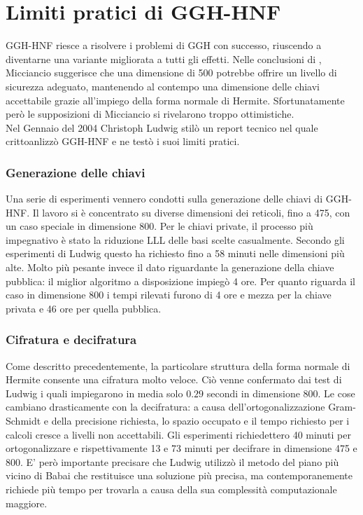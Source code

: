\section{Limiti pratici di GGH-HNF}
GGH-HNF riesce a risolvere i problemi di GGH con successo, riuscendo a diventarne una variante migliorata
a tutti gli effetti. Nelle conclusioni di \cite{HNF01}, Micciancio suggerisce che una dimensione di 
500 potrebbe offrire un livello di sicurezza adeguato, mantenendo al contempo una dimensione delle 
chiavi accettabile grazie all'impiego della forma normale di Hermite. Sfortunatamente però le 
supposizioni di Micciancio si rivelarono troppo ottimistiche. \\
Nel Gennaio del 2004 Christoph Ludwig stilò un report tecnico \cite{HNF04} nel quale crittoanlizzò
GGH-HNF e ne testò i suoi limiti pratici. 

\subsubsection{Generazione delle chiavi}
Una serie di esperimenti vennero condotti sulla generazione delle chiavi di GGH-HNF.
Il lavoro si è concentrato su diverse dimensioni dei reticoli, fino a 475, 
con un caso speciale in dimensione 800.
Per le chiavi private, il processo più impegnativo è stato la riduzione LLL delle basi scelte 
casualmente. Secondo gli esperimenti di Ludwig questo ha richiesto fino a 58 minuti nelle dimensioni più alte.
Molto più pesante invece il dato riguardante la generazione della chiave pubblica: il miglior algoritmo
a disposizione impiegò 4 ore. Per quanto riguarda il caso in dimensione 800 i tempi rilevati furono
di 4 ore e mezza per la chiave privata e 46 ore per quella pubblica.

\subsubsection{Cifratura e decifratura}
Come descritto precedentemente, la particolare struttura della forma normale di Hermite consente una
cifratura molto veloce. Ciò venne confermato dai test di Ludwig i quali impiegarono in media solo $0.29$
secondi in dimensione 800. Le cose cambiano drasticamente con la decifratura: a causa dell'ortogonalizzazione
Gram-Schmidt e della precisione richiesta, lo spazio occupato e il tempo richiesto per i calcoli
cresce a livelli non accettabili. Gli esperimenti richiedettero 40 minuti per ortogonalizzare
e rispettivamente 13 e 73 minuti per decifrare in dimensione 475 e 800. E' però importante precisare
che Ludwig utilizzò il metodo del piano più vicino di Babai che restituisce una soluzione più precisa, 
ma contemporanemente richiede più tempo per trovarla a causa della sua complessità computazionale maggiore. 


